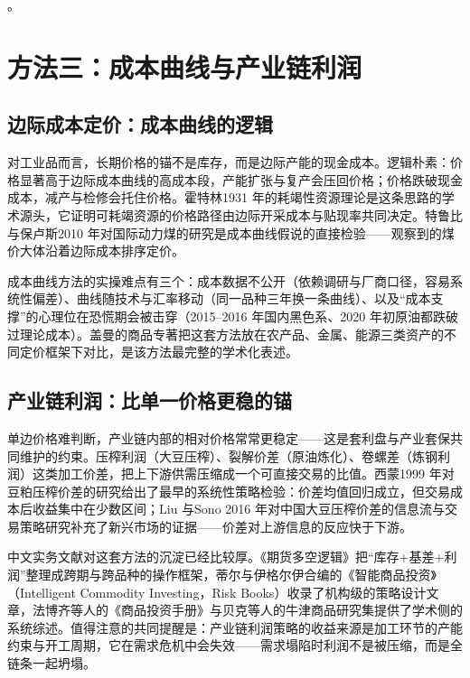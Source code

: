 \documentclass[12pt,a4paper]{ctexart}
\begin{document}
。

\section{方法三：成本曲线与产业链利润}

\subsection{边际成本定价：成本曲线的逻辑}

对工业品而言，长期价格的锚不是库存，而是边际产能的现金成本。逻辑朴素：价格显著高于边际成本曲线的高成本段，产能扩张与复产会压回价格；价格跌破现金成本，减产与检修会托住价格。霍特林1931 年的耗竭性资源理论是这条思路的学术源头，它证明可耗竭资源的价格路径由边际开采成本与贴现率共同决定\cite{19}。特鲁比与保卢斯2010 年对国际动力煤的研究是成本曲线假说的直接检验——观察到的煤价大体沿着边际成本排序定价\cite{20}。

成本曲线方法的实操难点有三个：成本数据不公开（依赖调研与厂商口径，容易系统性偏差）、曲线随技术与汇率移动（同一品种三年换一条曲线）、以及“成本支撑”的心理位在恐慌期会被击穿（2015--2016 年国内黑色系、2020 年初原油都跌破过理论成本）。盖曼的商品专著把这套方法放在农产品、金属、能源三类资产的不同定价框架下对比，是该方法最完整的学术化表述\cite{39}。

\subsection{产业链利润：比单一价格更稳的锚}

单边价格难判断，产业链内部的相对价格常常更稳定——这是套利盘与产业套保共同维护的约束。压榨利润（大豆压榨）、裂解价差（原油炼化）、卷螺差（炼钢利润）这类加工价差，把上下游供需压缩成一个可直接交易的比值。西蒙1999 年对豆粕压榨价差的研究给出了最早的系统性策略检验：价差均值回归成立，但交易成本后收益集中在少数区间\cite{91}；Liu 与Sono 2016 年对中国大豆压榨价差的信息流与交易策略研究补充了新兴市场的证据——价差对上游信息的反应快于下游\cite{92}。

中文实务文献对这套方法的沉淀已经比较厚。《期货多空逻辑》把“库存+基差+利润”整理成跨期与跨品种的操作框架\cite{49}，蒂尔与伊格尔伊合编的《智能商品投资》（Intelligent Commodity Investing，Risk Books）收录了机构级的策略设计文章\cite{41}，法博齐等人的《商品投资手册》与贝克等人的牛津商品研究集提供了学术侧的系统综述\cite{42, 43}。值得注意的共同提醒是：产业链利润策略的收益来源是加工环节的产能约束与开工周期，它在需求危机中会失效——需求塌陷时利润不是被压缩，而是全链条一起坍塌。
\end{document}

